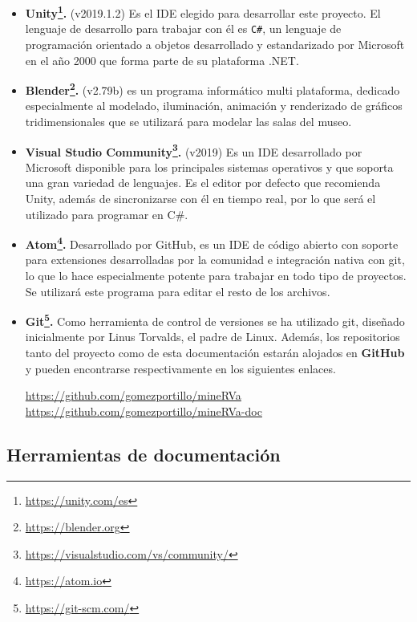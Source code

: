 \begin{itemize}
    \item \textbf{Unity\footnote{\url{https://unity.com/es}}.} (v2019.1.2) Es el \acs{IDE} elegido para desarrollar este proyecto. El lenguaje de desarrollo para trabajar con él es \texttt{C\#}, un lenguaje de programación orientado a objetos desarrollado y estandarizado por Microsoft  en el año 2000 que forma parte de su plataforma .NET.
    
    \item \textbf{Blender\footnote{\url{https://blender.org}}.} (v2.79b) es un programa informático multi plataforma, dedicado especialmente al modelado, iluminación, animación y renderizado de gráficos tridimensionales que se utilizará para modelar las salas del museo.
    
    \item \textbf{Visual Studio Community\footnote{\url{https://visualstudio.com/vs/community/}}.} (v2019) Es un \acs{IDE} desarrollado por Microsoft disponible para los principales sistemas operativos y que soporta una gran variedad de lenguajes. Es el editor por defecto que recomienda Unity, además de sincronizarse con él en tiempo real, por lo que será el utilizado para programar en C\#.
    
    \item \textbf{Atom\footnote{\url{https://atom.io}}.} Desarrollado por GitHub, es un \acs{IDE} de código abierto con soporte para extensiones desarrolladas por la comunidad e integración nativa con git, lo que lo hace especialmente potente para trabajar en todo tipo de proyectos. Se utilizará este programa para editar el resto de los archivos.
    
    \item \textbf{Git\footnote{\url{https://git-scm.com/}}.} Como herramienta de control de versiones se ha utilizado git, diseñado inicialmente por Linus Torvalds, el padre de Linux. Además, los repositorios tanto del proyecto como de esta documentación estarán alojados en \textbf{GitHub} y pueden encontrarse respectivamente en los siguientes enlaces.
    
    \begin{center}
        \url{https://github.com/gomezportillo/mineRVa}
        \url{https://github.com/gomezportillo/mineRVa-doc}
    \end{center}
    
\end{itemize}

\subsection{Herramientas de documentación}

